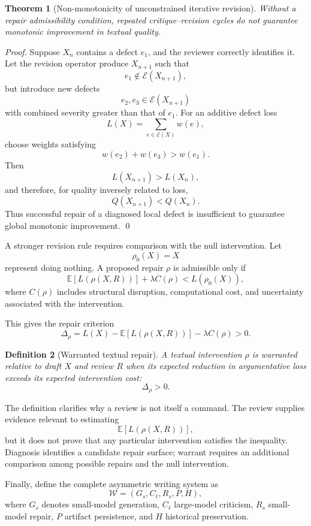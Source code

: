 \documentclass[11pt]{article}
\newtheorem{definition}{Definition}[section]
\newtheorem{theorem}[definition]{Theorem}
\begin{document}
\begin{theorem}[Non-monotonicity of unconstrained iterative revision]
Without a repair admissibility condition, repeated critique--revision cycles do not guarantee monotonic improvement in textual quality.
\end{theorem}

\begin{proof}
Suppose \(X_n\) contains a defect \(e_1\), and the reviewer correctly identifies it. Let the revision operator produce \(X_{n+1}\) such that
\[
    e_1\notin\mathcal{E}(X_{n+1}),
\]
but introduce new defects
\[
    e_2,e_3\in\mathcal{E}(X_{n+1})
\]
with combined severity greater than that of \(e_1\). For an additive defect loss
\[
    L(X)
    =
    \sum_{e\in\mathcal{E}(X)}w(e),
\]
choose weights satisfying
\[
    w(e_2)+w(e_3)>w(e_1).
\]
Then
\[
    L(X_{n+1})>L(X_n),
\]
and therefore, for quality inversely related to loss,
\[
    Q(X_{n+1})<Q(X_n).
\]
Thus successful repair of a diagnosed local defect is insufficient to guarantee global monotonic improvement. \qed
\end{proof}

A stronger revision rule requires comparison with the null intervention. Let
\[
    \rho_0(X)=X
\]
represent doing nothing. A proposed repair \(\rho\) is admissible only if
\[
    \mathbb{E}
    \left[
        L(\rho(X,R))
    \right]
    +
    \lambda C(\rho)
    <
    L(\rho_0(X)),
\]
where \(C(\rho)\) includes structural disruption, computational cost, and uncertainty associated with the intervention.

This gives the repair criterion
\[
    \Delta_\rho
    =
    L(X)
    -
    \mathbb{E}[L(\rho(X,R))]
    -
    \lambda C(\rho)
    >0.
\]

\begin{definition}[Warranted textual repair]
A textual intervention \(\rho\) is warranted relative to draft \(X\) and review \(R\) when its expected reduction in argumentative loss exceeds its expected intervention cost:
\[
    \Delta_\rho>0.
\]
\end{definition}

The definition clarifies why a review is not itself a command. The review supplies evidence relevant to estimating
\[
    \mathbb{E}[L(\rho(X,R))],
\]
but it does not prove that any particular intervention satisfies the inequality. Diagnosis identifies a candidate repair surface; warrant requires an additional comparison among possible repairs and the null intervention.

Finally, define the complete asymmetric writing system as
\[
    \mathcal{W}
    =
    \left(
        G_s,
        C_\ell,
        R_s,
        P,
        H
    \right),
\]
where \(G_s\) denotes small-model generation, \(C_\ell\) large-model criticism, \(R_s\) small-model repair, \(P\) artifact persistence, and \(H\) historical preservation.
\end{document}
